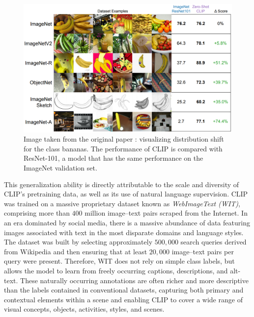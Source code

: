 \documentclass[a4paper, twoside, english]{sapthesis} %
\begin{document}
\begin{figure}[h]
    \centering
    \includegraphics[width=\textwidth]{img/CLIP_zero_shot.png}
    \caption{Image taken from the original paper \cite{radford2019language}: visualizing distribution shift for the class bananas. The performance of CLIP is compared with ResNet-101, a model that has the same performance on the ImageNet validation set.}
    \label{fig:clipzs2}
\end{figure}

This generalization ability is directly attributable to the scale and diversity of CLIP's pretraining data, as well as its use of natural language supervision. CLIP was trained on a massive proprietary dataset known as \emph{WebImageText (WIT)}, comprising more than $400$ million image–text pairs scraped from the Internet. In an era dominated by social media, there is a massive abundance of data featuring images associated with text in the most disparate domains and language styles. The dataset was built by selecting approximately $500,000$ search queries derived from Wikipedia and then ensuring that at least $20,000$ image–text pairs per query were present. Therefore, WIT does not rely on simple class labels, but allows the model to learn from freely occurring captions, descriptions, and alt-text. These naturally occurring annotations are often richer and more descriptive than the labels contained in conventional datasets, capturing both primary and contextual elements within a scene and enabling CLIP to cover a wide range of visual concepts, objects, activities, styles, and scenes.

\end{document}
